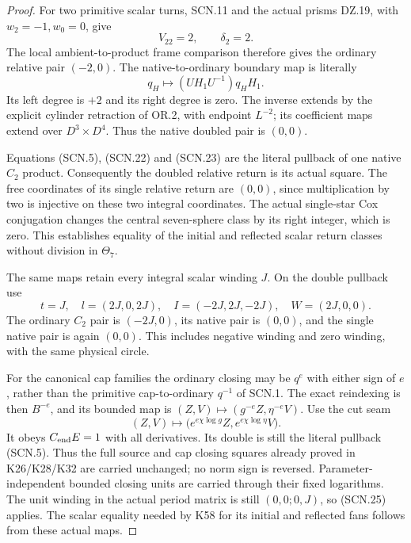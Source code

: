 \begin{proof}
For two primitive scalar turns, SCN.11 and the actual
prisms DZ.19, with \(w_2=-1,w_0=0\), give
\[
                    V_{22}=2,\qquad \delta_2=2.
\]
The local ambient-to-product frame comparison therefore
gives the ordinary relative pair \((-2,0)\).
The native-to-ordinary boundary map is literally
\[
                q_H\longmapsto
                 (UH_1U^{-1})q_HH_1.                 \tag{SCN.24}
\]
Its left degree is \(+2\) and its right degree is zero.
The inverse extends by the explicit cylinder retraction
of OR.2, with endpoint \(L^{-2}\); its coefficient maps
extend over \(D^3\times D^4\). Thus the native doubled
pair is \((0,0)\).

Equations (SCN.5), (SCN.22) and (SCN.23) are the literal
pullback of one native \(C_2\) product. Consequently
the doubled relative return is its actual square.
The free coordinates of its single relative return
are \((0,0)\), since multiplication by two is injective
on these two integral coordinates. The actual
single-star Cox conjugation changes the central
seven-sphere class by its right integer, which is
zero. This establishes equality of the initial and
reflected scalar return classes without division in
\(\Theta_7\).

The same maps retain every integral scalar winding
\(J\). On the double pullback use
\[
       t=J,\quad l=(2J,0,2J),\quad
       I=(-2J,2J,-2J),\quad W=(2J,0,0).
                                                        \tag{SCN.25}
\]
The ordinary \(C_2\) pair is \((-2J,0)\), its native
pair is \((0,0)\), and the single native pair is
again \((0,0)\). This includes negative winding and
zero winding, with the same physical circle.

For the canonical cap families the ordinary closing
may be \(q^e\) with either sign of \(e\), rather than
the primitive cap-to-ordinary \(q^{-1}\) of SCN.1.
The exact reindexing is then \(B^{-e}\), and its
bounded map is
\((Z,V)\mapsto(g^{-e}Z,\eta^{-e}V)\).
Use the cut seam
\[
       (Z,V)\mapsto
         \bigl(e^{e\chi\log g}Z,e^{e\chi\log\eta}V\bigr).
                                                        \tag{SCN.26}
\]
It obeys \(C_{\rm end}E=1\) with all derivatives.
Its double is still the literal pullback (SCN.5).
Thus the full source and cap closing squares already
proved in K26/K28/K32 are carried unchanged; no norm
sign is reversed. Parameter-independent bounded
closing units are carried through their fixed
logarithms. The unit winding in the actual period
matrix is still \((0,0;0,J)\), so (SCN.25) applies.
The scalar equality needed by K58 for its initial
and reflected fans follows from these actual maps.


\end{proof}
